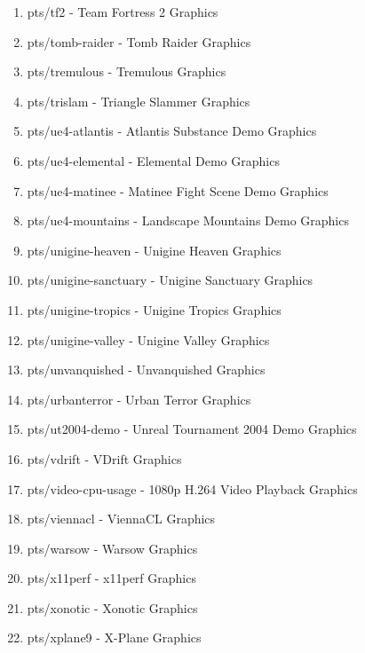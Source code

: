 \documentclass[french]{article}
\begin{document}
\begin{enumerate}
\item pts/tf2                        - Team Fortress 2                     Graphics 
\item pts/tomb-raider                - Tomb Raider                         Graphics 
\item pts/tremulous                  - Tremulous                           Graphics 
\item pts/trislam                    - Triangle Slammer                    Graphics 
\item pts/ue4-atlantis               - Atlantis Substance Demo             Graphics 
\item pts/ue4-elemental              - Elemental Demo                      Graphics 
\item pts/ue4-matinee                - Matinee Fight Scene Demo            Graphics 
\item pts/ue4-mountains              - Landscape Mountains Demo            Graphics 
\item pts/unigine-heaven             - Unigine Heaven                      Graphics 
\item pts/unigine-sanctuary          - Unigine Sanctuary                   Graphics 
\item pts/unigine-tropics            - Unigine Tropics                     Graphics 
\item pts/unigine-valley             - Unigine Valley                      Graphics 
\item pts/unvanquished               - Unvanquished                        Graphics 
\item pts/urbanterror                - Urban Terror                        Graphics 
\item pts/ut2004-demo                - Unreal Tournament 2004 Demo         Graphics 
\item pts/vdrift                     - VDrift                              Graphics 
\item pts/video-cpu-usage            - 1080p H.264 Video Playback          Graphics 
\item pts/viennacl                   - ViennaCL                            Graphics 
\item pts/warsow                     - Warsow                              Graphics 
\item pts/x11perf                    - x11perf                             Graphics 
\item pts/xonotic                    - Xonotic                             Graphics 
\item pts/xplane9                    - X-Plane                             Graphics 
\end{enumerate}
\end{document}

